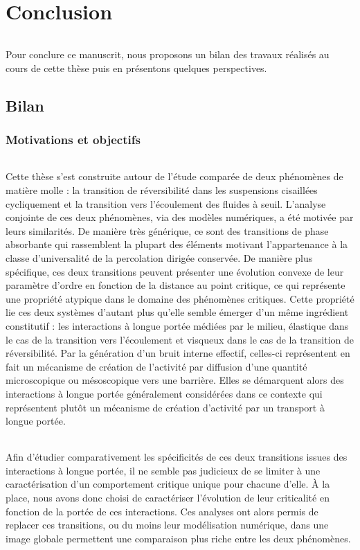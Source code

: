 \chapter*{Conclusion}
\label{chapter:conclusion}

\subparagraph{}Pour conclure ce manuscrit, nous proposons un bilan des travaux réalisés au cours de cette thèse puis en présentons quelques perspectives.

\section*{Bilan}

\subsection*{Motivations et objectifs}

\subparagraph{}Cette thèse s'est construite autour de l'étude comparée de deux phénomènes de matière molle : la transition de réversibilité dans les suspensions cisaillées cycliquement et la transition vers l'écoulement des fluides à seuil. L'analyse conjointe de ces deux phénomènes, via des modèles numériques, a été motivée par leurs similarités. De manière très générique, ce sont des transitions de phase absorbante qui rassemblent la plupart des éléments motivant l'appartenance à la classe d'universalité de la percolation dirigée conservée. De manière plus spécifique, ces deux transitions peuvent présenter une évolution convexe de leur paramètre d'ordre en fonction de la distance au point critique, ce qui représente une propriété atypique dans le domaine des phénomènes critiques. Cette propriété lie ces deux systèmes d'autant plus qu'elle semble émerger d'un même ingrédient constitutif : les interactions à longue portée médiées par le milieu, élastique dans le cas de la transition vers l'écoulement et visqueux dans le cas de la transition de réversibilité. Par la génération d'un bruit interne effectif, celles-ci représentent en fait un mécanisme de création de l'activité par diffusion d'une quantité microscopique ou mésoscopique vers une barrière. Elles se démarquent alors des interactions à longue portée généralement considérées dans ce contexte qui représentent plutôt un mécanisme de création d'activité par un transport à longue portée.

\subparagraph{}Afin d'étudier comparativement les spécificités de ces deux transitions issues des interactions à longue portée, il ne semble pas judicieux de se limiter à une caractérisation d'un comportement critique unique pour chacune d'elle. \`A la place, nous avons donc choisi de caractériser l'évolution de leur criticalité en fonction de la portée de ces interactions. Ces analyses ont alors permis de replacer ces transitions, ou du moins leur modélisation numérique, dans une image globale permettent une comparaison plus riche entre les deux phénomènes.


